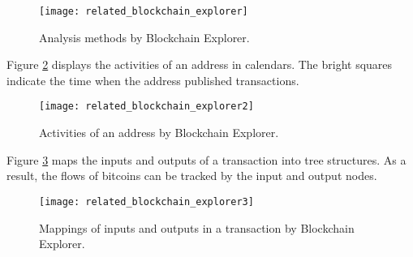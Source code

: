 \begin{itemize}
\begin{figure}[htb]
            \centering
            \texttt{[image: related\_blockchain\_explorer]}
            \caption{Analysis methods by Blockchain Explorer.}
            \label{fig:analysis methods by blockchain explorer}
        \end{figure}
        \clearpage
        Figure \ref{fig:activities of an address by blockchain explorer} \cite{Kuzuno2017} displays the activities of an address in calendars. The bright squares indicate the time when the address published transactions.
        \begin{figure}[htb]
            \centering
            \texttt{[image: related\_blockchain\_explorer2]}
            \caption{Activities of an address by Blockchain Explorer.}
            \label{fig:activities of an address by blockchain explorer}
        \end{figure}

        Figure \ref{fig:mappings of inputs and outputs in a transaction bblockchain explorer} \cite{Kuzuno2017} maps the inputs and outputs of a transaction into tree structures. As a result, the flows of bitcoins can be tracked by the input and output nodes. 
        \begin{figure}[htb]
            \centering
            \texttt{[image: related\_blockchain\_explorer3]}
            \caption{Mappings of inputs and outputs in a transaction by Blockchain Explorer.}
            \label{fig:mappings of inputs and outputs in a transaction bblockchain explorer}
        \end{figure}


\end{itemize}
